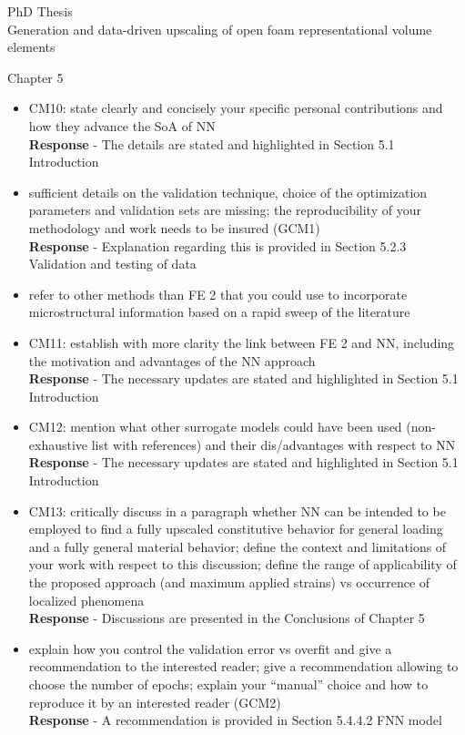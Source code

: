 \documentclass[12pt]{letter}
\begin{document}
\begin{letter}{PhD Thesis\\
Generation and data-driven upscaling of open foam representational volume elements}
\begin{itemize}
\end{itemize}

Chapter 5

\begin{itemize}

\item CM10: state clearly and concisely your specific personal contributions and how they
advance the SoA of NN
\\\textbf{Response} - The details are stated and highlighted in Section 5.1 Introduction

\item sufficient details on the validation technique, choice of the optimization parameters
and validation sets are missing; the reproducibility of your methodology and work
needs to be insured (GCM1)
\\\textbf{Response} - Explanation regarding this is provided in Section 5.2.3 Validation and testing of data

\item refer to other methods than FE 2 that you could use to incorporate microstructural
information based on a rapid sweep of the literature

\item CM11: establish with more clarity the link between FE 2 and NN, including the
motivation and advantages of the NN approach
\\\textbf{Response} - The necessary updates are stated and highlighted in Section 5.1 Introduction

\item CM12: mention what other surrogate models could have been used (non-
exhaustive list with references) and their dis/advantages with respect to NN
\\\textbf{Response} - The necessary updates are stated and highlighted in Section 5.1 Introduction

\item CM13: critically discuss in a paragraph whether NN can be intended to be
employed to find a fully upscaled constitutive behavior for general loading and a
fully general material behavior; define the context and limitations of your work with
respect to this discussion; define the range of applicability of the proposed
approach (and maximum applied strains) vs occurrence of localized phenomena
\\\textbf{Response} - Discussions are presented in the Conclusions of Chapter 5

\item explain how you control the validation error vs overfit and give a recommendation to
the interested reader; give a recommendation allowing to choose the number of
epochs; explain your “manual” choice and how to reproduce it by an interested
reader (GCM2)
\\\textbf{Response} - A recommendation is provided in Section 5.4.4.2 FNN model


\end{itemize}
\end{letter}
\end{document}
